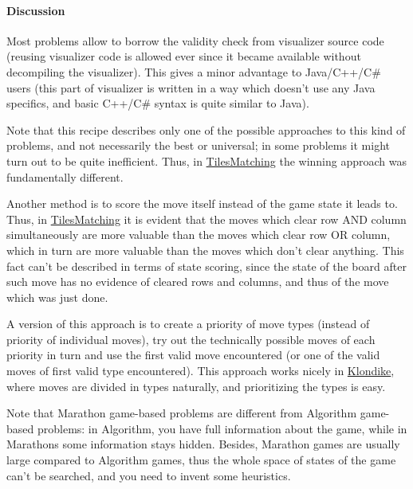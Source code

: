 \hypertarget{discussion-1}{%
\paragraph{Discussion}\label{discussion-1}}

Most problems allow to borrow the validity check from visualizer source
code (reusing visualizer code is allowed ever since it became available
without decompiling the visualizer). This gives a minor advantage to
Java/C++/C\# users (this part of visualizer is written in a way which
doesn't use any Java specifics, and basic C++/C\# syntax is quite
similar to Java).

Note that this recipe describes only one of the possible approaches to
this kind of problems, and not necessarily the best or universal; in
some problems it might turn out to be quite inefficient. Thus, in
\href{http://www.topcoder.com/longcontest/?module=ViewProblemStatement\&rd=13795\&pm=10410}{TilesMatching}
the winning approach was fundamentally different.

Another method is to score the move itself instead of the game state it
leads to. Thus, in
\href{http://www.topcoder.com/longcontest/?module=ViewProblemStatement\&rd=13795\&pm=10410}{TilesMatching}
it is evident that the moves which clear row AND column simultaneously
are more valuable than the moves which clear row OR column, which in
turn are more valuable than the moves which don't clear anything. This
fact can't be described in terms of state scoring, since the state of
the board after such move has no evidence of cleared rows and columns,
and thus of the move which was just done.

A version of this approach is to create a priority of move types
(instead of priority of individual moves), try out the technically
possible moves of each priority in turn and use the first valid move
encountered (or one of the valid moves of first valid type encountered).
This approach works nicely in
\href{http://www.topcoder.com/longcontest/?module=ViewProblemStatement\&rd=13565\&pm=10014}{Klondike},
where moves are divided in types naturally, and prioritizing the types
is easy.

Note that Marathon game-based problems are different from Algorithm
game-based problems: in Algorithm, you have full information about the
game, while in Marathons some information stays hidden. Besides,
Marathon games are usually large compared to Algorithm games, thus the
whole space of states of the game can't be searched, and you need to
invent some heuristics.

